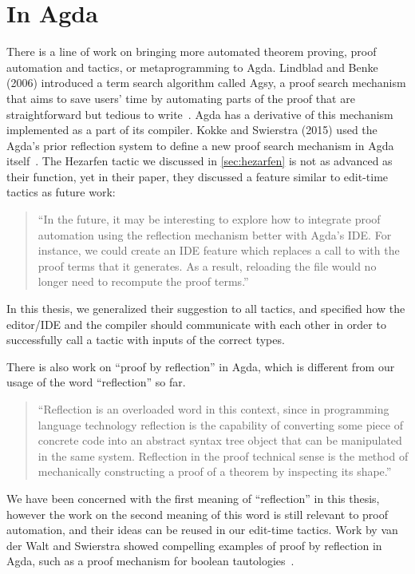 \section{In Agda}

There is a line of work on bringing more automated theorem proving,
proof automation and tactics, or metaprogramming to Agda.
Lindblad and Benke (2006) introduced a term search algorithm called
Agsy, a proof search mechanism that aims to save users' time by automating
parts of the proof that are straightforward but tedious to write~\cite{agsy}.
Agda has a derivative of this mechanism implemented as a part of its compiler.
Kokke and Swierstra (2015) used the Agda's prior reflection system to define a
new proof search mechanism in Agda itself~\cite{autoinagda}.
The Hezarfen tactic we discussed in \autoref{sec:hezarfen} is not as advanced
as their  function, yet in their paper, they discussed a feature
similar to edit-time tactics as future work:

\begin{quote}
  ``In the future, it may be interesting to explore how to integrate proof
  automation using the reflection mechanism better with Agda's IDE. For
  instance, we could create an IDE feature which replaces a call to
   with the proof terms that it generates. As a result, reloading
  the file would no longer need to recompute the proof terms.''~\cite{autoinagda}
\end{quote}

In this thesis, we generalized their suggestion to all tactics, and specified
how the editor/IDE and the compiler should communicate with each other
in order to successfully call a tactic with inputs of the correct types.

There is also work on ``proof by reflection'' in Agda, which is different from our
usage of the word ``reflection'' so far.

\begin{quote}\label{quote:reflection}
``Reflection is an overloaded word in this context, since in programming language
  technology reflection is the capability of converting some piece of concrete
  code into an abstract syntax tree object that can be manipulated in the same
  system. Reflection in the proof technical sense is the method of mechanically
  constructing a proof of a theorem by inspecting its shape.''~\cite{reflInAgda}
\end{quote}

We have been concerned with the first meaning of ``reflection'' in this thesis,
however the work on the second meaning of this word is still relevant to proof
automation, and their ideas can be reused in our edit-time tactics. Work by van
der Walt and Swierstra showed compelling examples of proof by reflection in
Agda, such as a proof mechanism for boolean tautologies~\cite{pfByReflAgda}.

